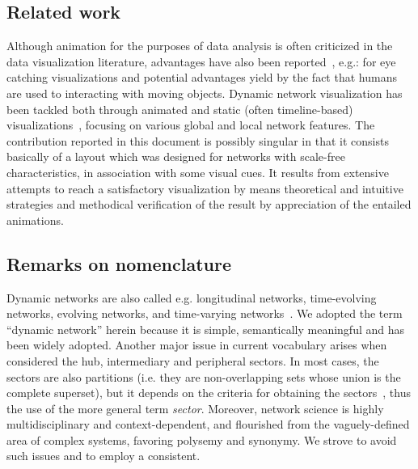 \documentclass[runningheads]{llncs}
\begin{document}
\subsection{Related work}
Although animation for the purposes of data analysis is often criticized in the data visualization literature, advantages have also been reported~\cite{anim,munzner,cog,ware}, e.g.: for eye catching visualizations and potential advantages yield by the fact that humans are used to interacting with moving objects.
Dynamic network visualization has been tackled both through animated and static (often timeline-based) visualizations~\cite{hajij,brain,visAn,ego}, focusing on various global and local network features.
The contribution reported in this document is possibly singular in that it consists basically of a layout which was designed for networks with scale-free characteristics, in association with some visual cues.
It results from extensive attempts to reach a satisfactory visualization by means theoretical and intuitive strategies and methodical verification of the result by appreciation of the entailed animations.

\subsection{Remarks on nomenclature}
Dynamic networks are also called e.g. longitudinal networks, time-evolving networks, evolving networks, and time-varying networks~\cite{ev,tev,tv,lg}.
We adopted the term ``dynamic network'' herein because it is simple, semantically meaningful and has been widely adopted.
Another major issue in current vocabulary arises when considered the hub, intermediary and peripheral sectors.
In most cases, the sectors are also partitions (i.e. they are non-overlapping sets whose union is the complete superset), but it depends on the criteria for obtaining the sectors~\cite{stab}, thus the use of the more general term \emph{sector}.
Moreover, network science is highly multidisciplinary and context-dependent, and flourished from the vaguely-defined area of complex systems, favoring polysemy and synonymy. We strove to avoid such issues and to employ a consistent.
\end{document}
